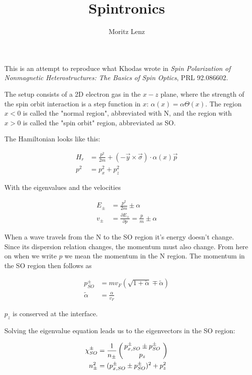 \documentclass[11pt]{article}
\author{Moritz Lenz}
\title{Spintronics}
\newcommand{\inp}[1]{\ensuremath{\left(#1\right)}}
\newcommand{\vect}[2]{\ensuremath{\inp{\hspace{-.8ex}\begin{array}{c}#1\\#2\end{array}\hspace{-.4ex}}}}
\begin{document}
\maketitle

This is an attempt to reproduce what Khodas wrote in {\em Spin 
Polarization of Nonmagnetic Heterostructures: The Basics of Spin
Optics}, PRL 92.086602.

The setup consists of a 2D electron gas in the $x-z$ plane, where the
strength of the spin orbit interaction is a step function in $x$:
$\alpha(x) = \alpha \Theta(x)$. The region $x < 0$ is called the
"normal region", abbreviated with N, and the region with $x > 0$ is
called the "spin orbit" region, abbreviated as SO.

The Hamiltonian looks like this:

\begin{align}
    H_r &= \frac{p^2}{2m} + (-\vec y \times \vec \sigma) \cdot
            \alpha(x) \vec p\\ 
    p^2 &= p_x^2 + p_z^2
\end{align}

With the eigenvalues and the velocities

\begin{align}
    E_{\pm} &= \frac{p^2}{2m} \pm \alpha \\
    v_{\pm} &= \frac{\partial E_{\pm}}{\partial p} = \frac{p}{m} \pm \alpha
\end{align}

When a wave travels from the N to the SO region it's energy doesn't
change. Since its dispersion relation changes, the momentum must also
change. From here on when we write $p$ we mean the momentum in the N
region. The momentum in the SO region then follows as

\begin{align}
    \label{eq:pso}
    p_{SO}^{\pm} &= m v_F (\sqrt{1 + \tilde \alpha} \mp \tilde \alpha) \\
    \tilde\alpha &= \frac{\alpha}{v_F}
\end{align}

$p_z$ is conserved at the interface.

Solving the eigenvalue equation leads us to the eigenvectors in the SO
region:

\begin{align*}
   \chi_{SO}^{\pm} &= \frac{1}{n_{\pm}} 
                      \vect{p_{x,SO}^{\pm} \pm p_{SO}^\pm}{p_z} \\
    n_{\pm}^2      &= (p_{x,SO}^{\pm} \pm p_{SO}^\pm)^2 + p_z^2
\end{align*}
\end{document}
